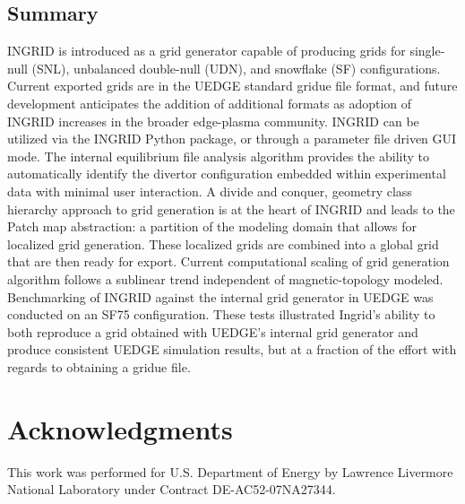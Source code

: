 \subsection{\label{sec:level2}Summary}
INGRID is introduced as a grid generator capable of producing grids for single-null (SNL), unbalanced double-null (UDN), and snowflake (SF) configurations. Current exported grids are in the UEDGE standard gridue file format, and future development anticipates the addition of additional formats as adoption of INGRID increases in the broader edge-plasma community. INGRID can be utilized via the INGRID Python package, or through a parameter file driven GUI mode. The internal equilibrium file analysis algorithm provides the ability to automatically identify the divertor configuration embedded within experimental data with minimal user interaction. A divide and conquer, geometry class hierarchy approach to grid generation is at the heart of INGRID and leads to the Patch map abstraction: a partition of the modeling domain that allows for localized grid generation. These localized grids are combined into a global grid that are then ready for export. Current computational scaling of grid generation algorithm follows a sublinear trend independent of magnetic-topology modeled. Benchmarking of INGRID against the internal grid generator in UEDGE was conducted on an SF75 configuration. These tests illustrated Ingrid's ability to both reproduce a grid obtained with UEDGE's internal grid generator and produce consistent UEDGE simulation results, but at a fraction of the effort with regards to obtaining a gridue file. 

\section{Acknowledgments}
This work was performed for U.S. Department of Energy by Lawrence Livermore National Laboratory under Contract DE-AC52-07NA27344.